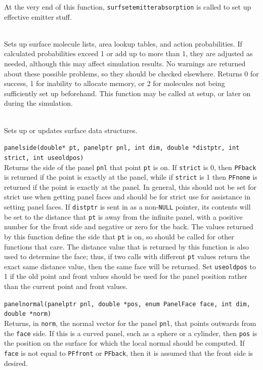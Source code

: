 \documentclass {scrbook}
\newcommand {\ttt} {\texttt}
\begin{document}
\begin{description}
At the very end of this function, \ttt{surfsetemitterabsorption} is called to set up effective emitter stuff.

\item[\ttt{int surfupdatelists(simptr sim)}]
\hfill \\
Sets up surface molecule lists, area lookup tables, and action probabilities. If calculated probabilities exceed 1 or add up to more than 1, they are adjusted as needed, although this may affect simulation results. No warnings are returned about these possible problems, so they should be checked elsewhere. Returns 0 for success, 1 for inability to allocate memory, or 2 for molecules not being sufficiently set up beforehand. This function may be called at setup, or later on during the simulation.

\item[\ttt{int surfupdate(simptr sim)}]
\hfill \\
Sets up or updates surface data structures.

\item[\underline{core simulation functions}]

\item[\ttt{enum PanelFace}]
\ttt{panelside(double* pt, panelptr pnl, int dim, double *distptr, int strict, int useoldpos)}
\hfill \\
Returns the side of the panel \ttt{pnl} that point \ttt{pt} is on. If \ttt{strict} is 0, then \ttt{PFback} is returned if the point is exactly at the panel, while if \ttt{strict} is 1 then \ttt{PFnone} is returned if the point is exactly at the panel. In general, this should not be set for strict use when getting panel faces and should be for strict use for assistance in setting panel faces. If \ttt{distptr} is sent in as a non-\ttt{NULL} pointer, its contents will be set to the distance that \ttt{pt} is away from the infinite panel, with a positive number for the front side and negative or zero for the back. The values returned by this function define the side that \ttt{pt} is on, so should be called for other functions that care. The distance value that is returned by this function is also used to determine the face; thus, if two calls with different \ttt{pt} values return the exact same distance value, then the same face will be returned. Set \ttt{useoldpos} to 1 if the old point and front values should be used for the panel position rather than the current point and front values.

\item[\ttt{void}]
\ttt{panelnormal(panelptr pnl, double *pos, enum PanelFace face, int dim, double *norm)}
\hfill \\
Returns, in \ttt{norm}, the normal vector for the panel \ttt{pnl}, that points outwards from the \ttt{face} side. If this is a curved panel, such as a sphere or a cylinder, then \ttt{pos} is the position on the surface for which the local normal should be computed. If \ttt{face} is not equal to \ttt{PFfront} or \ttt{PFback}, then it is assumed that the front side is desired.


\end{description}
\end{document}
